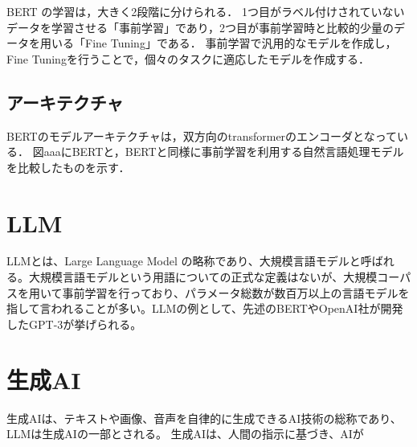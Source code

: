 BERT の学習は，大きく2段階に分けられる．
1つ目がラベル付けされていないデータを学習させる「事前学習」であり，2つ目が事前学習時と比較的少量のデータを用いる「Fine Tuning」である．
事前学習で汎用的なモデルを作成し，Fine Tuningを行うことで，個々のタスクに適応したモデルを作成する．

\subsection{アーキテクチャ}
BERTのモデルアーキテクチャは，双方向のtransformerのエンコーダとなっている．
図aaaにBERTと，BERTと同様に事前学習を利用する自然言語処理モデルを比較したものを示す．






\section{LLM \label{c4s6}}
LLMとは、Large Language Model の略称であり、大規模言語モデルと呼ばれる。大規模言語モデルという用語についての正式な定義はないが、大規模コーパスを用いて事前学習を行っており、パラメータ総数が数百万以上の言語モデルを指して言われることが多い。LLMの例として、先述のBERTやOpenAI社が開発したGPT-3が挙げられる。

\section{生成AI \label{c4s7}}
生成AIは、テキストや画像、音声を自律的に生成できるAI技術の総称であり、LLMは生成AIの一部とされる。
生成AIは、人間の指示に基づき、AIが

